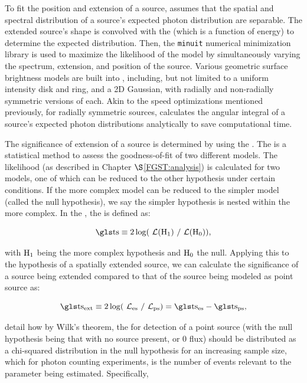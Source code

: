 To fit the position and extension of a source, \ptlike{} assumes that the spatial and spectral distribution of a source's expected photon distribution are separable. The extended source's shape is convolved with the \lat{} \psf{} (which is a function of energy) to determine the expected distribution. Then, the {\tt minuit} numerical minimization library\citep{James75} is used to maximize the likelihood of the model by simultaneously varying the spectrum, extension, and position of the source. Various geometric surface brightness models are built into \ptlike{}, including, but not limited to a uniform intensity disk and ring, and a 2D Gaussian, with radially and non-radially symmetric versions of each. Akin to the speed optimizations mentioned previously, for radially symmetric sources, \ptlike{} calculates the angular integral of a source's expected photon distributions analytically to save computational time.

The significance of extension of a source is determined by using the \lrt{}. The \lrt{} is a statistical method to assess the goodness-of-fit of two different models. The likelihood (as described in Chapter $\S$\ref{FGST:analysis}) is calculated  for two models, one of which can be reduced to the other hypothesis under certain conditions. If the more complex model can be reduced to the simpler model (called the null hypothesis), we say the simpler hypothesis is nested within the more complex. In the \lrt{}, the \ts{} is defined as: 

\begin{equation}
\rm \ts{} \equiv 2\log(\like{}(H_1)~/ \like{}(H_0)),
\end{equation}

with ${\rm H_1}$ being the more complex hypothesis and ${\rm H_0}$ the null. Applying this to the hypothesis of a spatially extended source, we can calculate the significance of a source being extended compared to that of the source being modeled as point source as:

\begin{equation}\label{eq:tsext}
\rm \ts{}_{ext} \equiv 2\log(\like_{\rm es}~/ \like_{\rm ps}) = \ts{}_{es} - \ts{}_{ps},
\end{equation}

\cite{mattox96} detail how by Wilk's theorem, the \ts{} for detection of a point source (with the null hypothesis being that with no source present, or 0 flux) should be distributed as a chi-squared  distribution in the null hypothesis for an increasing sample size, which for photon counting experiments, is the number of events relevant to the parameter being estimated. Specifically, 

